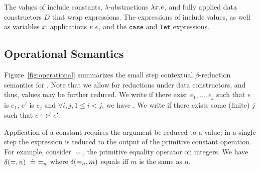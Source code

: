 The values of \undeclang include constants, 
$\lambda$-abstractions $\efun{x}{\typ}{e}$, and 
fully applied data constructors $D$ that wrap expressions.
%
The expressions of \undeclang include values, as well as
variables $x$, 
applications $\eapp{e}{e}$, 
and the $\mathtt{case}$ 
and $\mathtt{let}$ expressions.

\subsection{Operational Semantics}

Figure~\ref{fig:operational} summarizes the small 
step contextual $\beta$-reduction semantics for 
\undeclang.
%
Note that we allow for reductions under data constructors, 
and thus, values may be further reduced.
%
We write  if there exist $e_1,\ldots,e_j$ such that
$e$ is $e_1$, $e'$ is $e_j$ and $\forall i,j, 1 \leq i < j$, we have
.
%
We write  if there exists some (finite) $j$ such that
$\evalj{e}{e'}{j}$.

 Application of a constant requires the
argument be reduced to a value; in a single step the 
expression is reduced to the output of the primitive 
constant operation. 
%
For example, consider $=$, the primitive equality operator 
on integers. We have $\ceval{=}{n} \defeq =_n$
where $\ceval{=_n}{m}$ equals \etrue iff $m$ is the same as $n$.



